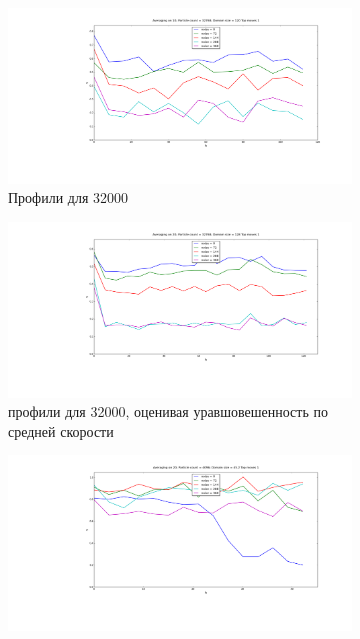         \begin{figure}
        \centering
        \begin{subfigure}{0.45\textwidth}
                \includegraphics[width=\textwidth]{32k_slices}
                \caption{Профили для 32000}
                \label{fig:Results:32k}
        \end{subfigure}
        \begin{subfigure}{0.45\textwidth}
                \includegraphics[width=\textwidth]{32k_slicesOldAlg}
                \caption{профили для 32000, оценивая уравшовешенность по средней скорости}
                \label{fig:Results:32kOld}
        \end{subfigure}
        \begin{subfigure}{0.45\textwidth}
                \includegraphics[width=\textwidth]{4k_slices_newAlg}

\end{subfigure}
\end{figure}

